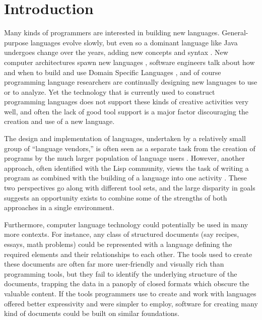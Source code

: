 \chapter{Introduction}


Many kinds of programmers are interested in building new languages. General-purpose languages evolve slowly, but even so a dominant language like Java undergoes change over the years, adding new concepts and syntax \cite{java-generics}. New computer architectures spawn new languages \cite{ctm}\cite{cuda}\cite{opencl}, software engineers talk about how and when to build and use Domain Specific Languages \cite{fowler}, and of course programming language researchers are continually designing new languages to use or to analyze. Yet the technology that is currently used to construct programming languages does not support these kinds of creative activities very well, and often the lack of good tool support is a major factor discouraging the creation and use of a new language.

The design and implementation of languages, undertaken by a relatively small group of ``language vendors,'' is often seen as a separate task from the creation of programs by the much larger population of language users \cite{intentional}\cite{ward}. However, another approach, often identified with the Lisp community, views the task of writing a program as combined with the building of a language into one activity \cite{on-lisp}. These two perspectives go along with different tool sets, and the large disparity in goals suggests an opportunity exists to combine some of the strengths of both approaches in a single environment.

Furthermore, computer language technology could potentially be used in many more contexts. For instance, any class of structured documents (say recipes, essays, math problems) could be represented with a language defining the required elements and their relationships to each other. The tools used to create these documents are often far more user-friendly and visually rich than programming tools, but they fail to identify the underlying structure of the documents, trapping the data in a panoply of closed formats which obscure the valuable content. If the tools programmers use to create and work with languages offered better expressivity and were simpler to employ, software for creating many kind of documents could be built on similar foundations. 

%
%
